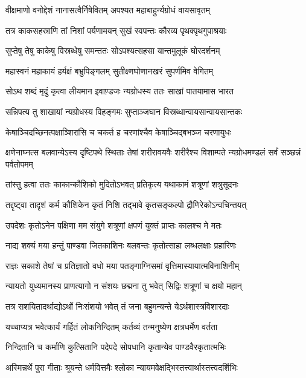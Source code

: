 \twolineshloka
{वीक्षमाणो वनोद्देशं नानासत्वैर्निषेवितम्}
{अपश्यत महाबाहुर्न्यग्रोधं वायसावृतम्}


\twolineshloka
{तत्र काकसहस्राणि तां निशां पर्यणामयन्}
{सुखं स्वपन्तः कौरव्य पृथक्पृथगुपाश्रयाः}


\twolineshloka
{सुप्तेषु तेषु काकेषु विस्रब्धेषु समन्ततः}
{सोऽपश्यत्सहसा यान्तमुलूकं घोरदर्शनम्}


\twolineshloka
{महास्वनं महाकायं हर्यक्षं बभ्रुपिङ्गलम्}
{सुतीक्ष्णघोणानखरं सुपर्णमिव वेगितम्}


\twolineshloka
{सोऽथ शब्दं मृदुं कृत्वा लीयमान इवाण़्डजः}
{न्यग्रोधस्य ततः साखां पातयामास भारत}


\twolineshloka
{सन्निपत्य तु शाखायां न्यग्रोधस्य विहङ्गमः}
{सुप्ताञ्जघान विस्रब्धान्वायसान्वायसान्तकः}


\twolineshloka
{केषाञ्चिदच्छिनत्पक्षाञ्शिरांसि च चकर्त ह}
{चरणांश्चैव केषाञ्चिद्बभञ्ज चरणायुधः}


क्षणेनाघ्नत्स बलवान्येऽस्य दृष्टिपथे स्थिताः
\twolineshloka
{तेषां शरीरावयवैः शरीरैश्च विशाम्पते}
{न्यग्रोधमण्डलं सर्वं सञ्छन्नं पर्वतोपमम्}


\twolineshloka
{तांस्तु हत्वा ततः काकान्कौशिको मुदितोऽभवत्}
{प्रतिकृत्य यथाकामं शत्रूणां शत्रुसूदनः}


\twolineshloka
{तद्दृष्ट्वा तादृशं कर्म कौशिकेन कृतं निशि}
{तद्भावे कृतसङ्कल्पो द्रौणिरेकोऽन्वचिन्तयत्}


\twolineshloka
{उपदेशः कृतोऽनेन पक्षिणा मम संयुगे}
{शत्रूणां क्षपणं युक्तं प्राप्तः कालश्च मे मतः}


\twolineshloka
{नाद्य शक्यं मया हन्तुं पाण्डवा जितकाशिनः}
{बलवन्तः कृतोत्साहा लब्धलक्षाः प्रहारिणः}


\twolineshloka
{राज्ञः सकाशे तेषां च प्रतिज्ञातो वधो मया}
{पतङ्गाग्निसमां वृत्तिमास्यायात्मविनाशिनीम्}


\twolineshloka
{न्यायतो युध्यमानस्य प्राणत्यागो न संशयः}
{छद्मना तु भवेत् सिद्विः शत्रूणां च क्षयो महान्}


\twolineshloka
{तत्र सशयितादर्थाद्योऽर्थो निःसंशयो भवेत्}
{तं जना बहुमन्यन्ते येऽर्थशास्त्रविशारदाः}


\twolineshloka
{यच्चाप्यत्र भवेत्कार्यं गर्हितं लोकनिन्दितम्}
{कर्तव्यं तन्मनुष्येण क्षत्रधर्मेण वर्तता}


\twolineshloka
{निन्दितानि च कर्माणि कुत्सितानि पदेपदे}
{सोपधानि कृतान्येव पाण्डवैरकृतात्मभिः}


\twolineshloka
{अस्मिन्नर्थे पुरा गीताः श्रूयन्ते धर्मवित्तमैः}
{श्लोका न्यायमवेक्षद्भिस्तत्त्वार्थास्तत्त्वदर्शिभिः}


